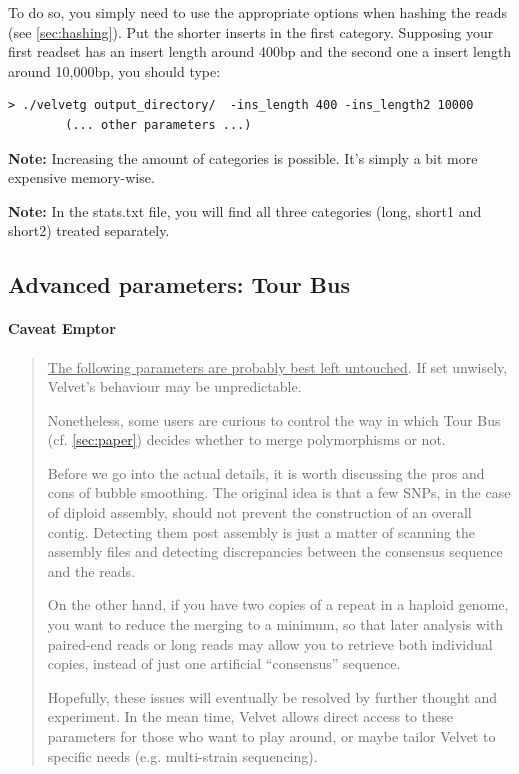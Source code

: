 \documentclass{article}
\begin{document}
To do so, you simply need to use the appropriate options when hashing the
reads (see \ref{sec:hashing}). Put the shorter inserts in the first category. Supposing your first  readset has an insert length around 400bp and the second one a insert length around 10,000bp, you should type:

\begin{verbatim}
> ./velvetg output_directory/  -ins_length 400 -ins_length2 10000  
		(... other parameters ...)
\end{verbatim}

\textbf{Note:} Increasing the amount of categories is possible. It's simply a bit more
expensive memory-wise. 

\textbf{Note:} In the stats.txt file, you will find all three categories (long,
short1 and short2) treated separately.

\subsection{Advanced parameters: Tour Bus}

\paragraph{Caveat Emptor}
\begin{quotation}
\underline{The following parameters are probably best left untouched}. If set unwisely, Velvet's behaviour may be unpredictable. 

Nonetheless, some users are curious to control the way in which Tour Bus (cf. \ref{sec:paper}) decides whether to merge polymorphisms or not.

Before we go into the actual details, it is worth discussing the pros and cons of bubble smoothing. The original idea is that a few SNPs, in the case of diploid assembly, should not prevent the construction of an overall contig. Detecting them post assembly is just a matter of scanning the assembly files and detecting discrepancies between the consensus sequence and the reads.  

On the other hand, if you have two copies of a repeat in a haploid genome, you want to reduce the merging to a minimum, so that later analysis with paired-end reads or long reads may allow you to retrieve both individual copies, instead of just one artificial ``consensus'' sequence.

Hopefully, these issues will eventually be resolved by further thought and experiment. In the mean time, Velvet allows direct access to these parameters for those who want to play around, or maybe tailor Velvet to specific needs (e.g. multi-strain sequencing). 
\end{quotation}
\end{document}
